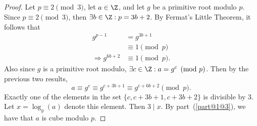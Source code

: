 \documentclass[
  coursecode={MTHE 418},
  assignmentname={Homework \homeworknumber},
  studentnumber=20053722,
  name={Bryan Hoang},z
  draft,
]{
  ltxanswer%
}
\begin{document}
\begin{questions}
\begin{parts}
      \part{}
      \begin{solution}
        \begin{proof}
          Let \(p \equiv 2 \pmod{3}\), let \(a \in \Z\), and let \(g\) be a primitive root modulo \(p\). Since \(p \equiv 2 \pmod{3}\), then \(\exists b \in \Z : p = 3b + 2\). By Fermat's Little Theorem, it follows that
          \begin{align*}
            g^{p-1}                &= g^{3b + 1}       \\
                                   &\equiv 1 \pmod{p}  \\
            \Rightarrow g^{6b + 2} &\equiv 1 \pmod{p}.
          \end{align*}
          Also since \(g\) is a primitive root modulo, \(\exists c \in \Z : a = g^{c} \pmod{p}\). Then by the previous two results,
          \begin{equation*}
            a \equiv g^{c} \equiv g^{c + 3b + 1} \equiv g^{c + 6b + 2} \pmod{p}.
          \end{equation*}
          Exactly one of the elements in the set \(\{c, c + 3b + 1, c + 3b + 2\}\) is divisible by 3. Let \(x = \log_{g}(a)\) denote this element. Then \(3 \mid x\). By part~(\ref{part@1@3}), we have that \(a\) is cube modulo \(p\).
        \end{proof}
      \end{solution}
    \end{parts}
  \end{questions}
\end{document}
